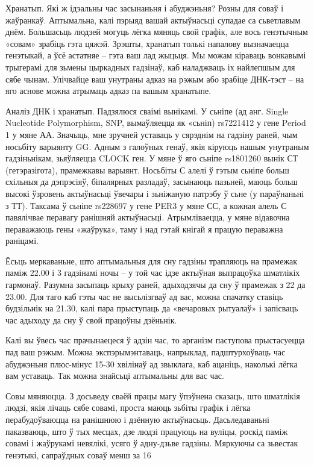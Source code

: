 Хранатып. Які ж ідэальны час засынаньня і абуджэньня? Розны для соваў і жаўранкаў. Аптымальна, калі пэрыяд вашай актыўнасьці супадае са сьветлавым днём. Большасьць людзей могуць лёгка мяняць свой графік, але вось генэтычным «совам» зрабіць гэта цяжэй. Зрэшты, хранатып толькі напалову вызначаецца генэтыкай, а ўсё астатняе – гэта ваш лад жыцьця. Мы можам кіраваць вонкавымі трыгерамі для зьмены цыркадных гадзінаў, каб наладжваць іх найлепшым для сябе чынам. Улічвайце ваш унутраны адказ на рэжым або зрабіце ДНК-тэст – на яго аснове можна атрымаць адказ па вашым хранатыпе.

Аналіз ДНК і хранатып. Падзялюся сваімі вынікамі. У сьніпе (ад анг. Single Nucleotide Polymorphism, SNP, вымаўляецца як «сьніп) rs7221412 у гене Period 1 у мяне АА. Значыць, мне зручней уставаць у сярэднім на гадзіну раней, чым носьбіту варыянту GG. Адным з галоўных генаў, якія кіруюць нашым унутраным гадзіньнікам, зьяўляецца CLOCK ген. У мяне ў яго сьніпе rs1801260 вынік СТ (гетэразігота), прамежкавы варыянт. Носьбіты С алелі ў гэтым сьніпе больш схільныя да дэпрэсіяў, біпалярных разладаў, засынаюць пазьней, маюць больш высокі ўзровень актыўнасьці ўвечары і зьніжаную патрэбу ў сьне (у параўнаньні з ТТ). Таксама ў сьніпе rs228697 у гене PER3 у мяне СС, а кожная алель С павялічвае перавагу ранішняй актыўнасьці. Атрымліваецца, у мяне відавочна пераважаюць гены «жаўрука», таму і над гэтай кнігай я працую пераважна раніцамі.

Ёсьць меркаваньне, што аптымальныя для сну гадзіны трапляюць на прамежак паміж 22.00 і 3 гадзінамі ночы – у той час ідзе актыўная выпрацоўка шматлікіх гармонаў. Разумна засыпаць крыху раней, адыходзячы да сну ў прамежак з 22 да 23.00. Для таго каб гэты час не высьлізгваў ад вас, можна спачатку ставіць будзільнік на 21.30, калі пара прыступаць да «вечаровых рытуалаў» і запісваць час адыходу да сну ў свой працоўны дзёньнік.

Калі вы ўвесь час прачынаецеся ў адзін час, то арганізм паступова прыстасуецца пад ваш рэжым. Можна экспэрымэнтаваць, напрыклад, падштурхоўваць час абуджэньня плюс-мінус 15-30 хвілінаў ад звыклага, каб ацаніць, наколькі лёгка вам уставаць. Так можна знайсьці аптымальны для вас час.

Совы мяняюцца. З досьведу сваёй працы магу ўпэўнена сказаць, што шматлікія людзі, якія лічаць сябе совамі, проста маюць зьбіты графік і лёгка перабудоўваюцца на ранішнюю і дзённую актыўнасьць. Дасьледаваньні паказваюць, што ў тых месцах, дзе людзі працуюць на вуліцы, роскід паміж совамі і жаўрукамі невялікі, усяго ў адну-дзьве гадзіны. Мяркуючы са зьвестак генэтыкі, сапраўдных соваў менш за 16%

